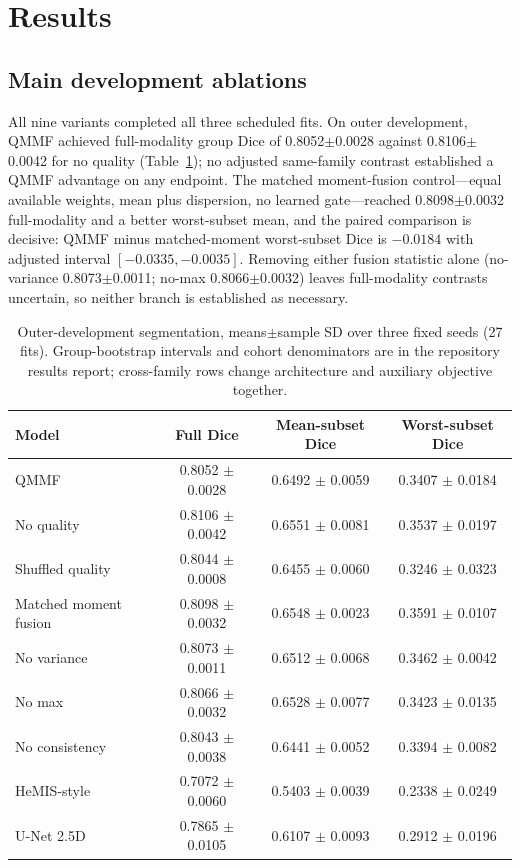 \section{Results}
\label{sec:results}

\subsection{Main development ablations}
\label{sec:main}

All nine variants completed all three scheduled fits. On outer development, QMMF achieved full-modality group Dice of 0.8052$\pm$0.0028 against 0.8106$\pm$0.0042 for no quality (Table~\ref{tab:main}); no adjusted same-family contrast established a QMMF advantage on any endpoint. The matched moment-fusion control---equal available weights, mean plus dispersion, no learned gate---reached 0.8098$\pm$0.0032 full-modality and a better worst-subset mean, and the paired comparison is decisive: QMMF minus matched-moment worst-subset Dice is $-0.0184$ with adjusted interval $[-0.0335,-0.0035]$. Removing either fusion statistic alone (no-variance 0.8073$\pm$0.0011; no-max 0.8066$\pm$0.0032) leaves full-modality contrasts uncertain, so neither branch is established as necessary.

\begin{table}[tp]
\centering
\caption{Outer-development segmentation, means$\pm$sample SD over three fixed seeds (27 fits). Group-bootstrap intervals and cohort denominators are in the repository results report; cross-family rows change architecture and auxiliary objective together.}
\label{tab:main}
\begin{tabular}{lccc}
\toprule
Model & Full Dice & Mean-subset Dice & Worst-subset Dice \\
\midrule
QMMF & 0.8052 $\pm$ 0.0028 & 0.6492 $\pm$ 0.0059 & 0.3407 $\pm$ 0.0184 \\
No quality & 0.8106 $\pm$ 0.0042 & 0.6551 $\pm$ 0.0081 & 0.3537 $\pm$ 0.0197 \\
Shuffled quality & 0.8044 $\pm$ 0.0008 & 0.6455 $\pm$ 0.0060 & 0.3246 $\pm$ 0.0323 \\
Matched moment fusion & 0.8098 $\pm$ 0.0032 & 0.6548 $\pm$ 0.0023 & 0.3591 $\pm$ 0.0107 \\
No variance & 0.8073 $\pm$ 0.0011 & 0.6512 $\pm$ 0.0068 & 0.3462 $\pm$ 0.0042 \\
No max & 0.8066 $\pm$ 0.0032 & 0.6528 $\pm$ 0.0077 & 0.3423 $\pm$ 0.0135 \\
No consistency & 0.8043 $\pm$ 0.0038 & 0.6441 $\pm$ 0.0052 & 0.3394 $\pm$ 0.0082 \\
HeMIS-style & 0.7072 $\pm$ 0.0060 & 0.5403 $\pm$ 0.0039 & 0.2338 $\pm$ 0.0249 \\
U-Net 2.5D & 0.7865 $\pm$ 0.0105 & 0.6107 $\pm$ 0.0093 & 0.2912 $\pm$ 0.0196 \\
\bottomrule
\end{tabular}
\end{table}

